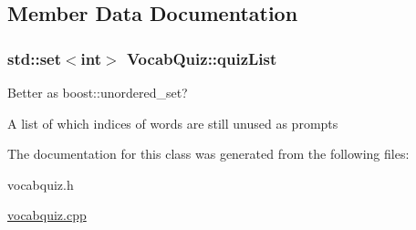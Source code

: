 \subsection{Member Data Documentation}
\hypertarget{classVocabQuiz_a294e44914f7766a1cdfff9ae87c722ff}{
\subsubsection[{quizList}]{\setlength{\rightskip}{0pt plus 5cm}std::set$<$int$>$ {\bf VocabQuiz::quizList}}}
\label{classVocabQuiz_a294e44914f7766a1cdfff9ae87c722ff}


Better as boost::unordered\_\-set? 

A list of which indices of words are still unused as prompts 

The documentation for this class was generated from the following files:\begin{DoxyCompactItemize}
\item 
vocabquiz.h\item 
\hyperlink{vocabquiz_8cpp}{vocabquiz.cpp}\end{DoxyCompactItemize}
